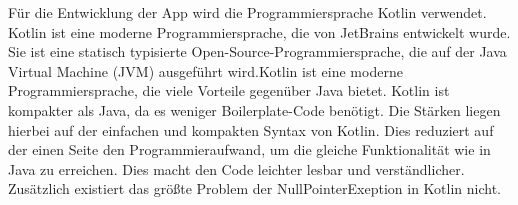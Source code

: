 \noindent
Für die Entwicklung der App wird die Programmiersprache Kotlin verwendet. Kotlin ist eine moderne Programmiersprache, die von JetBrains entwickelt wurde. Sie ist eine statisch typisierte Open-Source-Programmiersprache, die auf der Java Virtual Machine (JVM) ausgeführt wird.Kotlin ist eine moderne Programmiersprache, die viele Vorteile gegenüber Java bietet. Kotlin ist kompakter als Java, da es weniger Boilerplate-Code benötigt. Die Stärken liegen hierbei auf der einfachen und kompakten Syntax von Kotlin. Dies reduziert auf der einen Seite den Programmieraufwand, um die gleiche Funktionalität wie in Java zu erreichen. Dies macht den Code leichter lesbar und verständlicher. Zusätzlich existiert das größte Problem der NullPointerExeption in Kotlin nicht. \cite {bollhoff_kotlin_2022}
